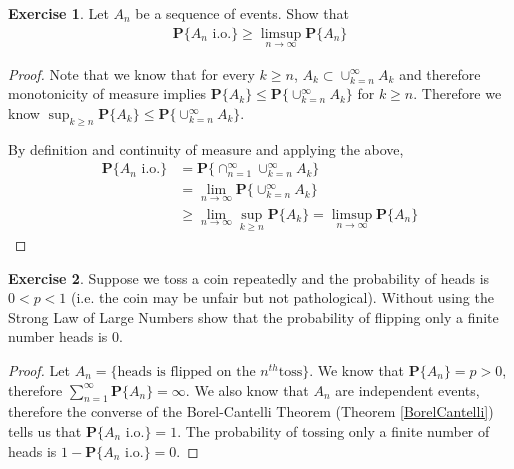 \documentclass{amsbook}
\theoremstyle{definition}
\newtheorem{xca}{Exercise}
\theoremstyle{remark}
\newcommand{\probability}[1]{\textbf{P}\{#1\}}
\begin{document}
\begin{xca}Let $A_n$ be a sequence of events. Show that 
\begin{align*}
\probability{A_n \text{ i.o.}} \geq \limsup_{n \to \infty} \probability{A_n}
\end{align*}
\end{xca}
\begin{proof}
Note that we know that for every $k\geq n$, $A_k \subset
\cup_{k=n}^\infty A_k$ and therefore monotonicity of measure implies $\probability{A_k} \leq
\probability{\cup_{k=n}^\infty A_k}$ for $k\geq n$.  Therefore we know
$\sup_{k\geq n} \probability{A_k} \leq
\probability{\cup_{k=n}^\infty A_k}$.

By definition and continuity of measure and applying the above,
\begin{align*}
\probability{A_n \text{ i.o.}} &= \probability{\cap_{n=1}^\infty
  \cup_{k=n}^\infty A_k} \\
&= \lim_{n \to \infty} \probability{\cup_{k=n}^\infty A_k} \\
&\geq \lim_{n \to \infty} \sup_{k \geq n} \probability{ A_k} =
\limsup_{n \to \infty} \probability{ A_n} 
\end{align*}
\end{proof}

\begin{xca}Suppose we toss a coin repeatedly and the probability of
  heads is $0 < p < 1$ (i.e. the coin may be unfair but not
  pathological).  Without using the Strong Law of Large Numbers show
  that the probability of flipping only a finite number heads is $0$.
\end{xca}
\begin{proof}
Let $A_n = \lbrace \text{heads is flipped on the }n^{th}\text{
  toss}\rbrace$.  We know that $\probability{A_n} = p >0$, therefore
$\sum_{n=1}^\infty \probability{A_n} = \infty$.  We also know that
$A_n$ are independent events, therefore the converse of the
Borel-Cantelli Theorem (Theorem \ref{BorelCantelli}) tells us that $\probability{ A_n \text{ i.o.}}
= 1$.  The probability of tossing only a finite number of
heads is $1 - \probability{ A_n \text{ i.o.}} = 0$.
\end{proof}
\end{document}
